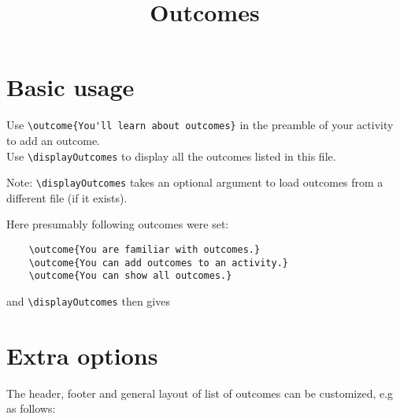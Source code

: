 \documentclass{ximera}
\title{Outcomes}
\begin{document}
\begin{abstract}
\end{abstract}
\maketitle

\section{Basic usage}

Use \verb|\outcome{You'll learn about outcomes}| in the preamble of your activity to add an outcome.
\\
Use \verb|\displayOutcomes| to display all the outcomes listed in this file.

Note: \verb|\displayOutcomes| takes an optional argument to load outcomes from a different file (if it exists).

Here presumably following outcomes were set:

\begin{verbatim}
    \outcome{You are familiar with outcomes.}
    \outcome{You can add outcomes to an activity.}
    \outcome{You can show all outcomes.}
\end{verbatim}

and \verb|\displayOutcomes| then gives 

\displayOutcomes


\section{Extra options}

The header, footer and general layout of list of outcomes can be customized, e.g as follows:

\renewcommand{\outcomeHeader}{outcomeHeader}
\renewcommand{\preOutputBlock}{\protect preOutputBlock \begin{itemize}}
\renewcommand{\postOutputBlock}{\end{itemize} postOutputBlock}

 \displayOutcomes
\end{document}
